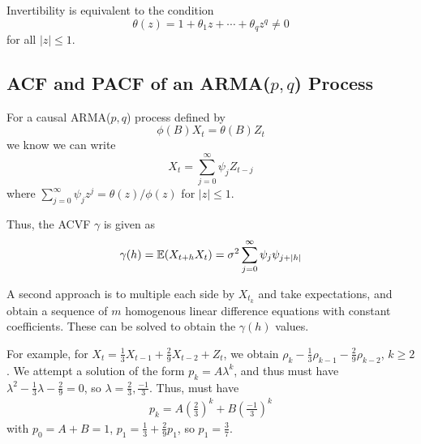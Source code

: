\begin{thm}
  \label{defn:arma_processes:6}
  Invertibility is equivalent to the condition
  \begin{equation}
    \label{eq:24}
    \theta(z) = 1 + \theta_{1}z + \cdots + \theta_{q} z^{q} \neq 0
  \end{equation} for all $|z| \leq 1$.
\end{thm}

\subsection{ACF and PACF of an \textsc{ARMA}($p, q$) Process}
\label{sec:acf-pacf-an}

\begin{thm}
  \label{defn:arma_processes:7}
  For a causal \textsc{ARMA}($p, q$) process defined by
  \begin{equation}
    \label{eq:28}
    \phi(B) X_{t} = \theta(B) Z_{t}
  \end{equation} we know we can write
  \begin{equation}
    \label{eq:29}
    X_{t} = \sum_{j=0}^{\infty} \psi_{j} Z_{t-j}
  \end{equation} where $\sum_{j=0}^{\infty} \psi_{j} z^{j} = \theta(z)
  / \phi(z)$ for $|z| \leq 1$.

  Thus, the ACVF $\gamma$ is given as
  \begin{equation}
    \label{eq:30}
    \gamma(h) = \E{X_{t+h} X_{t}} = \sigma^{2} \sum_{j=0}^{\infty}
    \psi_{j} \psi_{j+|h|}
  \end{equation}

  A second approach is to multiple each side by $X_{t_k}$ and take
  expectations, and obtain a sequence of $m$ homogenous linear
  difference equations with constant coefficients.  These can be
  solved to obtain the $\gamma(h)$ values.

  For example, for $X_{t} = \frac{1}{3} X_{t-1} + \frac{2}{9} X_{t-2}
  + Z_{t}$, we obtain $\rho_{k} - \frac{1}{3} \rho_{k-1} - \frac{2}{9}
  \rho_{k-2}$, $k \geq 2$.  We attempt a solution of the form $p_{k} =
  A \lambda^{k}$, and thus must have $\lambda^{2} - \frac{1}{3}
  \lambda - \frac{2}{9} = 0$, so $\lambda = \frac{2}{3},
  \frac{-1}{3}$.  Thus, must have
  \begin{align}
    \label{eq:81}
    p_{k} = A (\frac{2}{3})^{k} + B (\frac{-1}{3})^{k}
  \end{align} with $p_{0} = A + B = 1$, $p_{1} = \frac{1}{3} +
  \frac{2}{9} p_{1}$, so $p_{1} = \frac{3}{7}$.
\end{thm}

